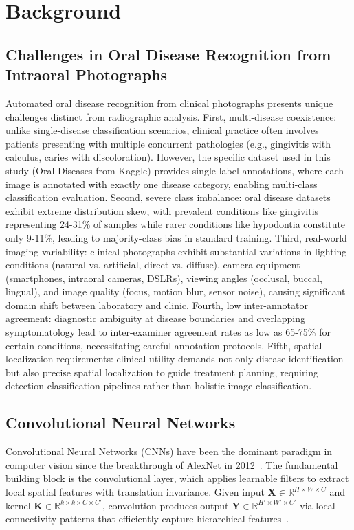 \section{Background}
\label{sec:background}
\subsection{Challenges in Oral Disease Recognition from Intraoral Photographs}

Automated oral disease recognition from clinical photographs presents unique challenges distinct from radiographic analysis. First, multi-disease coexistence: unlike single-disease classification scenarios, clinical practice often involves patients presenting with multiple concurrent pathologies (e.g., gingivitis with calculus, caries with discoloration). However, the specific dataset used in this study (Oral Diseases from Kaggle) provides single-label annotations, where each image is annotated with exactly one disease category, enabling multi-class classification evaluation. Second, severe class imbalance: oral disease datasets exhibit extreme distribution skew, with prevalent conditions like gingivitis representing 24-31\% of samples while rarer conditions like hypodontia constitute only 9-11\%, leading to majority-class bias in standard training. Third, real-world imaging variability: clinical photographs exhibit substantial variations in lighting conditions (natural vs. artificial, direct vs. diffuse), camera equipment (smartphones, intraoral cameras, DSLRs), viewing angles (occlusal, buccal, lingual), and image quality (focus, motion blur, sensor noise), causing significant domain shift between laboratory and clinic. Fourth, low inter-annotator agreement: diagnostic ambiguity at disease boundaries and overlapping symptomatology lead to inter-examiner agreement rates as low as 65-75\% for certain conditions, necessitating careful annotation protocols. Fifth, spatial localization requirements: clinical utility demands not only disease identification but also precise spatial localization to guide treatment planning, requiring detection-classification pipelines rather than holistic image classification.

\subsection{Convolutional Neural Networks}

Convolutional Neural Networks (CNNs) have been the dominant paradigm in computer vision since the breakthrough of AlexNet in 2012~\cite{li2021deep}. The fundamental building block is the convolutional layer, which applies learnable filters to extract local spatial features with translation invariance. Given input $\mathbf{X} \in \mathbb{R}^{H \times W \times C}$ and kernel $\mathbf{K} \in \mathbb{R}^{k \times k \times C \times C'}$, convolution produces output $\mathbf{Y} \in \mathbb{R}^{H' \times W' \times C'}$ via local connectivity patterns that efficiently capture hierarchical features~\cite{li2021deep}.

